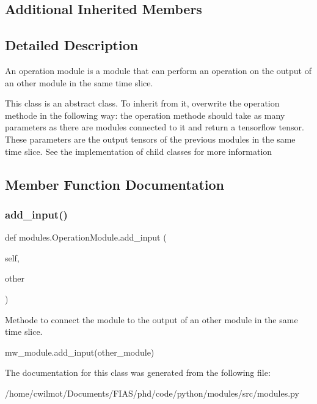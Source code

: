 \subsection*{Additional Inherited Members}


\subsection{Detailed Description}
An operation module is a module that can perform an operation on the output of an other module in the same time slice. 

This class is an abstract class. To inherit from it, overwrite the \textquotesingle{}operation\textquotesingle{} methode in the following way\+: the operation methode should take as many parameters as there are modules connected to it and return a tensorflow tensor. These parameters are the output tensors of the previous modules in the same time slice. See the implementation of child classes for more information 

\subsection{Member Function Documentation}
\mbox{\label{classmodules_1_1_operation_module_a781d6ef84166df2f1b08abb324d1f7c8}} 
\subsubsection{\texorpdfstring{add\+\_\+input()}{add\_input()}}
{\footnotesize\ttfamily def modules.\+Operation\+Module.\+add\+\_\+input (\begin{DoxyParamCaption}\item[{}]{self,  }\item[{}]{other }\end{DoxyParamCaption})}



Methode to connect the module to the output of an other module in the same time slice. 

mw\+\_\+module.\+add\+\_\+input(other\+\_\+module) 

The documentation for this class was generated from the following file\+:\begin{DoxyCompactItemize}
\item 
/home/cwilmot/\+Documents/\+F\+I\+A\+S/phd/code/python/modules/src/modules.\+py\end{DoxyCompactItemize}
